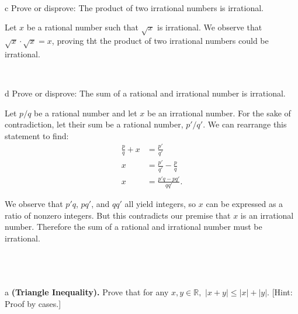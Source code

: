 \documentclass{article}
\begin{document}
\

\begin{problem} c
Prove or disprove: The product of two irrational numbers is irrational.
\end{problem}

Let $x$ be a rational number such that $\sqrt{x}$ is irrational. We observe that $\sqrt{x} \cdot \sqrt{x} = x$, proving tht the product of two irrational numbers could be irrational.

\

\begin{problem} d
Prove or disprove: The sum of a rational and irrational number is irrational.
\end{problem}

Let $p/q$ be a rational number and let $x$ be an irrational number. For the sake of contradiction, let their sum be a rational number, $p'/q'$. We can rearrange this statement to find:
\begin{align*}
    \frac{p}{q} + x &= \frac{p'}{q'} \\
    x &= \frac{p'}{q'} - \frac{p}{q} \\
    x &= \frac{p'q - pq'}{qq'}.
\end{align*}

We observe that $p'q$, $pq'$, and $qq'$ all yield integers, so $x$ can be expressed as a ratio of nonzero integers. But this contradicts our premise that $x$ is an irrational number. Therefore the sum of a rational and irrational number must be irrational.

\
\hline
\section{}

\begin{problem} a
\textbf{(Triangle Inequality).} Prove that for any $x,y\in\mathbb{R},$ $|x+y|\le |x|+|y|$. [Hint: Proof by cases.]
\end{problem}
\end{document}
